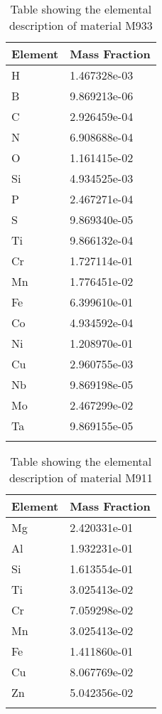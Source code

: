 \begin{centering}
\begin{longtable}[ht!]
{ p{} | p{} }
\hline
Element & Mass Fraction\\
\hline
H &  1.467328e-03\\
B &  9.869213e-06\\
C &  2.926459e-04\\
N &  6.908688e-04\\
O &  1.161415e-02\\
Si &  4.934525e-03\\
P &  2.467271e-04\\
S &  9.869340e-05\\
Ti &  9.866132e-04\\
Cr &  1.727114e-01\\
Mn &  1.776451e-02\\
Fe &  6.399610e-01\\
Co &  4.934592e-04\\
Ni &  1.208970e-01\\
Cu &  2.960755e-03\\
Nb &  9.869198e-05\\
Mo &  2.467299e-02\\
Ta &  9.869155e-05\\
\caption{Table showing the elemental description of material M933}
\label{table:material_UPTRAP}
\end{longtable}
\clearpage

\begin{longtable}[ht!]
  { p{} | p{} }
\hline
Element & Mass Fraction\\
\hline
Mg &  2.420331e-01\\
Al &  1.932231e-01\\
Si &  1.613554e-01\\
Ti &  3.025413e-02\\
Cr &  7.059298e-02\\
Mn &  3.025413e-02\\
Fe &  1.411860e-01\\
Cu &  8.067769e-02\\
Zn &  5.042356e-02\\
\caption{Table showing the elemental description of material M911}
\label{table:material_EppExFrames}
\end{longtable}
\clearpage


\end{centering}
